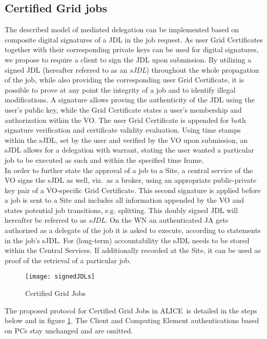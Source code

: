 \documentclass[10pt]{iopart}
\newcommand{\alice}{ALICE}
\begin{document}
\subsection{Certified Grid jobs}
\label{sjdl}
The described model of mediated delegation can be implemented based on 
composite digital signatures of a JDL in the job request.
As user Grid Certificates together with their corresponding private keys can
be used for digital signatures, we
propose to require a client to sign the JDL upon submission.
By utilizing a signed JDL (hereafter referred to as an \textit{sJDL})
throughout the whole propagation of the job, while also providing the corresponding 
user Grid Certificate, it is 
possible to prove at any point the integrity of a job and to identify illegal
modifications. A signature allows proving the authenticity of the
JDL using the user's public key, while the Grid Certificate states a user's
membership and authorization within the VO.
The user Grid Certificate is appended for both signature verification and
certificate validity evaluation. Using time stamps within the sJDL, set by the user and
verified by the VO upon submission, an sJDL allows for a delegation with
warrant, stating the user wanted a particular job to be executed as such and within
the specified time frame.\\
In order to further
state the approval of a job to a Site, a central service of the VO signs the
sJDL as well, viz.\ as a broker, using an appropriate public-private key pair of a
VO-specific Grid Certificate. This second
signature is applied before a job is sent to a Site and includes all
information appended by the VO and states potential job transitions,
e.g. splitting. This doubly signed JDL will hereafter be referred to as
\textit{sJDL}. On the WN an authenticated JA gets authorized
as a delegate of the job it is asked to execute,
according to statements in the job's
sJDL. For (long-term) accountability the 
 sJDL needs to be stored within the Central
Services. If additionally recorded at the Site, it can be used as proof
of the retrieval of a particular job.
\begin{figure}[h]
\centering
\texttt{[image: signedJDLs]}
\caption{Certified Grid Jobs}
\label{sJDL}
\end{figure}
The proposed protocol for Certified Grid Jobs in \alice\ is
detailed in the steps below and in figure \ref{sJDL}. 
The Client and Computing Element authentications based on PCs stay
unchanged and are omitted.\\
\end{document}
